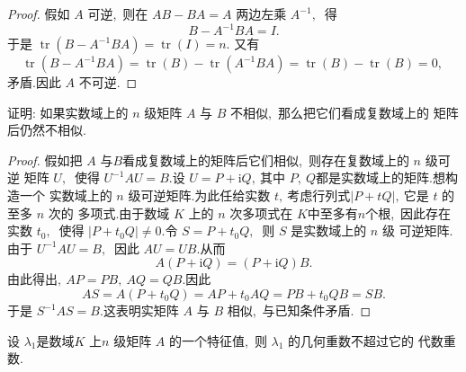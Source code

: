 \begin{proof}
	假如  $A $ 可逆,\  则在 $ A B-B A=A $ 两边左乘 $ A^{-1} ,\ $ 得
	$$B-A^{-1} B A=I .$$
	于是  $\operatorname{tr}\left(B-A^{-1} B A\right)=\operatorname{tr}(I)=n  .$ 又有
	$$\operatorname{tr}\left(B-A^{-1} B A\right)=\operatorname{tr}(B)-\operatorname{tr}\left(A^{-1} B A\right)=\operatorname{tr}(B)-\operatorname{tr}(B)=0,\ $$
	矛盾.因此 $ A $ 不可逆.
\end{proof}
\begin{problem}
	证明: 如果实数域上的 $ n $ 级矩阵  $A$  与  $B $ 不相似,\  那么把它们看成复数域上的 矩阵后仍然不相似.
\end{problem}
\begin{proof}
	假如把  $A $ 与$  B  $看成复数域上的矩阵后它们相似,\  则存在复数域上的  $n $ 级可逆 矩阵  $U ,\ $ 使得 $ U^{-1} A U=B  .$设  $U=P+\mathrm{i} Q ,\  $其中 $ P ,\  Q  $都是实数域上的矩阵.想构造一个 实数域上的  $n $ 级可逆矩阵.为此任给实数  $t ,\  $考虑行列式$  |P+t Q| ,\  $它是 $ t $ 的至多 $ n $ 次的 多项式.由于数域  $K $ 上的  $n$  次多项式在 $ K  $中至多有$  n  $个根,\ 因此存在实数 $ t_{0} ,\ $ 使得 $ \left|P+t_{0} Q\right| \neq 0 .$令 $ S=P+t_{0} Q ,\ $ 则  $S$  是实数域上的  $n$  级 可逆矩阵.
	由于 $ U^{-1} A U=B ,\ $ 因此 $ A U=U B .$从而
	$$A(P+\mathrm{i} Q)=(P+\mathrm{i} Q) B .$$
	由此得出$,\   A P=P B,\  A Q=Q B .$因此
	$$A S=A\left(P+t_{0} Q\right)=A P+t_{0} A Q=P B+t_{0} Q B=S B .$$
	于是 $ S^{-1} A S=B .$这表明实矩阵  $A$  与 $ B$  相似,\  与已知条件矛盾.
\end{proof}
\newpage
\begin{proposition}
	设  $\lambda_{1}  $是数域$  K $ 上$  n$  级矩阵 $ A $ 的一个特征值,\  则  $\lambda_{1} $ 的几何重数不超过它的 代数重数.
\end{proposition}
